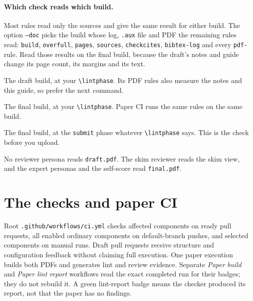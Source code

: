 \paragraph{Which check reads which build.} Most rules read only the sources and give the same result for either build. The option \texttt{--doc} picks the build whose log, \texttt{.aux} file and PDF the remaining rules read: \texttt{build}, \texttt{overfull}, \texttt{pages}, \texttt{sources}, \texttt{checkcites}, \texttt{bibtex-log} and every \texttt{pdf-} rule. Read those results on the final build, because the draft's notes and guide change its page count, its margins and its text.
\begin{description}[noitemsep]
  \item[\texttt{make check}] The draft build, at your \texttt{\textbackslash lintphase}. Its PDF rules also measure the notes and this guide, so prefer the next command.
  \item[\texttt{make check-final}] The final build, at your \texttt{\textbackslash lintphase}. Paper CI runs the same rules on the same build.
  \item[\texttt{make check-submit}] The final build, at the \texttt{submit} phase whatever \texttt{\textbackslash lintphase} says. This is the check before you upload.
\end{description}
No reviewer persona reads \texttt{draft.pdf}. The skim reviewer reads the skim view, and the expert personas and the self-score read \texttt{final.pdf}.

\section{The checks and paper CI}\label{guide:code:paperci}
Root \texttt{.github/workflows/ci.yml} checks affected components on ready pull requests, all enabled ordinary components on default-branch pushes, and selected components on manual runs. Draft pull requests receive structure and configuration feedback without claiming full execution. One paper execution builds both PDFs and generates lint and review evidence. Separate \emph{Paper build} and \emph{Paper lint report} workflows read the exact completed run for their badges; they do not rebuild it. A green lint-report badge means the checker produced its report, not that the paper has no findings.


